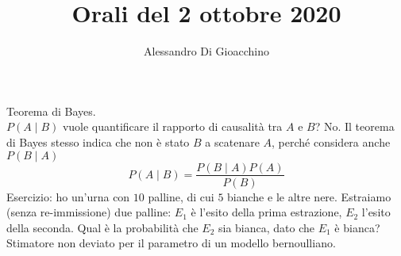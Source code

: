 \documentclass{article}
\title{Orali del 2 ottobre 2020}
\author{Alessandro Di Gioacchino}
\begin{document}
    \maketitle
    
    Teorema di Bayes. \\
    $ P ( A \mid B ) $ vuole quantificare il rapporto di causalità tra $ A $ e $ B $? No. Il teorema di Bayes stesso indica che non è stato $ B $ a scatenare $ A $, perché considera
    anche $ P ( B \mid A ) $ \\
    \[
        P ( A \mid B ) = \frac{ P ( B \mid A ) P ( A ) }{ P ( B ) }
    \]
    Esercizio: ho un'urna con $ 10 $ palline, di cui $ 5 $ bianche e le altre nere. Estraiamo (senza re-immissione) due palline: $ E_1 $ è l'esito della prima estrazione, $ E_2 $
    l'esito della seconda. Qual è la probabilità che $ E_2 $ sia bianca, dato che $ E_1 $ è bianca? \\
    Stimatore non deviato per il parametro di un modello bernoulliano. \\
    
\end{document}
